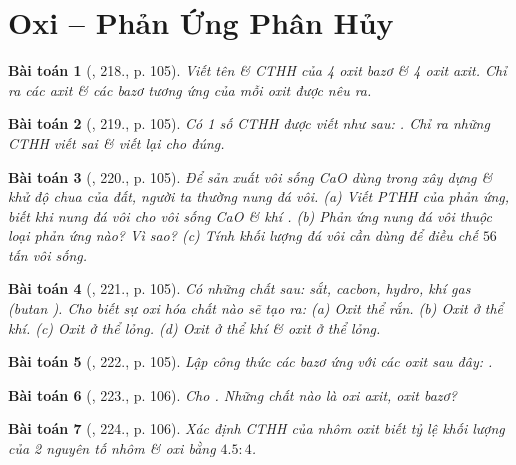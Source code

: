 \documentclass{article}
\newtheorem{baitoan}{Bài toán}
\begin{document}

\section{Oxi -- Phản Ứng Phân Hủy}

\begin{baitoan}[\cite{An_400_BT_Hoa_Hoc_8_2020}, 218., p. 105]
	Viết tên \& CTHH của 4 oxit bazơ \& 4 oxit axit. Chỉ ra các axit \& các bazơ tương ứng của mỗi oxit được nêu ra.
\end{baitoan}

\begin{baitoan}[\cite{An_400_BT_Hoa_Hoc_8_2020}, 219., p. 105]
	Có 1 số CTHH được viết như sau: \emph{}. Chỉ ra những CTHH viết sai \& viết lại cho đúng.
\end{baitoan}

\begin{baitoan}[\cite{An_400_BT_Hoa_Hoc_8_2020}, 220., p. 105]
	Để sản xuất vôi sống \emph{CaO} dùng trong xây dựng \& khử độ chua của đất, người ta thường nung đá vôi. (a) Viết PTHH của phản ứng, biết khi nung đá vôi cho vôi sống \emph{CaO} \& khí \emph{}. (b) Phản ứng nung đá vôi thuộc loại phản ứng nào? Vì sao? (c) Tính khối lượng đá vôi cần dùng để điều chế $56$ tấn vôi sống.
\end{baitoan}

\begin{baitoan}[\cite{An_400_BT_Hoa_Hoc_8_2020}, 221., p. 105]
	Có những chất sau: sắt, cacbon, hydro, khí gas (butan \emph{}). Cho biết sự oxi hóa chất nào sẽ tạo ra: (a) Oxit thể rắn. (b) Oxit ở thể khí. (c) Oxit ở thể lỏng. (d) Oxit ở thể khí \& oxit ở thể lỏng.
\end{baitoan}

\begin{baitoan}[\cite{An_400_BT_Hoa_Hoc_8_2020}, 222., p. 105]
	Lập công thức các bazơ ứng với các oxit sau đây: \emph{}.
\end{baitoan}

\begin{baitoan}[\cite{An_400_BT_Hoa_Hoc_8_2020}, 223., p. 106]
	Cho \emph{}. Những chất nào là oxi axit, oxit bazơ?
\end{baitoan}

\begin{baitoan}[\cite{An_400_BT_Hoa_Hoc_8_2020}, 224., p. 106]
	Xác định CTHH của nhôm oxit biết tỷ lệ khối lượng của 2 nguyên tố nhôm \& oxi bằng $4.5:4$.
\end{baitoan}
\end{document}
